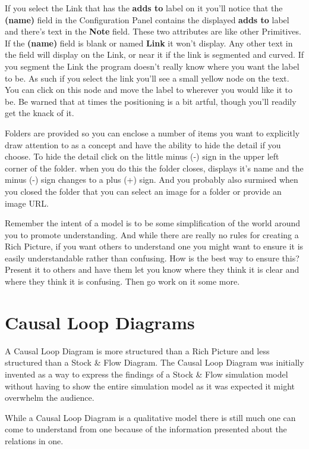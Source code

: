 \documentclass[]{memoir}
\renewcommand{\a}[1]{\textbf{#1}}
\begin{document}
If you select the Link that has the \a{adds to} label on it you'll
notice that the \a{(name)} field in the Configuration Panel contains the
displayed \a{adds to} label and there's text in the \a{Note} field.
These two attributes are like other Primitives. If the \a{(name)} field
is blank or named \a{Link} it won't display. Any other text in the field
will display on the Link, or near it if the link is segmented and
curved. If you segment the Link the program doesn't really know where
you want the label to be. As such if you select the link you'll see a
small yellow node on the text. You can click on this node and move the
label to wherever you would like it to be. Be warned that at times the
positioning is a bit artful, though you'll readily get the knack of it.

Folders are provided so you can enclose a number of items you want to
explicitly draw attention to as a concept and have the ability to hide
the detail if you choose. To hide the detail click on the little minus
(-) sign in the upper left corner of the folder. when you do this the
folder closes, displays it's name and the minus (-) sign changes to a
plus (+) sign. And you probably also surmised when you closed the folder
that you can select an image for a folder or provide an image URL.

Remember the intent of a model is to be some simplification of the world
around you to promote understanding. And while there are really no rules
for creating a Rich Picture, if you want others to understand one you
might want to ensure it is easily understandable rather than confusing.
How is the best way to ensure this? Present it to others and have them
let you know where they think it is clear and where they think it is
confusing. Then go work on it some more.

\section{Causal Loop Diagrams}

A Causal Loop Diagram is more structured than a Rich Picture and less
structured than a Stock \& Flow Diagram. The Causal Loop Diagram was
initially invented as a way to express the findings of a Stock \& Flow
simulation model without having to show the entire simulation model as
it was expected it might overwhelm the audience.

While a Causal Loop Diagram is a qualitative model there is still much
one can come to understand from one because of the information presented
about the relations in one.
\end{document}

